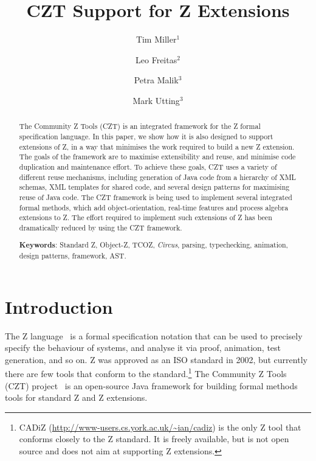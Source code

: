 \documentclass{llncs}
\newcommand{\Circus}{{\sf\slshape Circus}}
\begin{document}
\title{CZT Support for Z Extensions}
\author{Tim Miller$^1$ \and Leo Freitas$^2$ \and Petra Malik$^3$ \and Mark Utting$^3$}


\maketitle


\begin{abstract}
  The Community Z Tools (CZT) is an integrated
  framework for the Z formal specification language.  In this
  paper, we show how it is also designed to support extensions
  of Z, in a way that minimises the work required to build a
  new Z extension.  The goals of the framework are to maximise
  extensibility and reuse, and minimise code duplication and
  maintenance effort.  To achieve these goals, CZT uses a variety of
  different reuse mechanisms, including generation of Java
  code from a hierarchy of XML schemas, XML templates for shared
  code, and several design patterns for maximising reuse of Java
  code.
  The CZT framework is being used to implement several integrated
  formal methods, which add object-orientation, real-time features
  and process algebra extensions to Z.  The effort required to
  implement such extensions of Z has been dramatically reduced
  by using the CZT framework.

  \noindent
  \textbf{Keywords}: Standard Z, Object-Z, TCOZ, \Circus, parsing,
     typechecking, animation, design patterns, framework, AST.
\end{abstract}

\section{Introduction} \label{sec:intro}

  The Z language~\cite{isoz} is a formal specification notation that
  can be used to precisely specify the behaviour of systems, and
  analyse it via proof, animation, test generation, and so on.
  Z was approved as an ISO standard in 2002, but currently there are few
  tools that conform to the standard.\footnote{CADiZ
  (\url{http://www-users.cs.york.ac.uk/~ian/cadiz}) is the only Z tool
  that conforms closely to the Z standard.  It is freely available,
  but is not open source and does not aim at supporting Z extensions.}
  The Community Z Tools (CZT) project~\cite{czt} is an open-source Java
  framework for building formal methods tools for standard Z and Z extensions.
\end{document}
